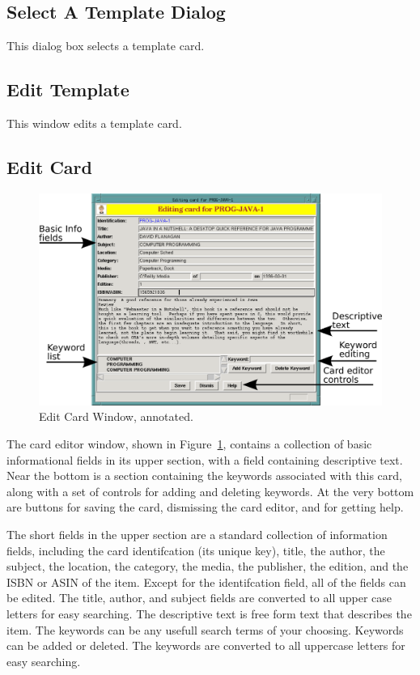\subsection{Select A Template Dialog}
This dialog box selects a template card.
\subsection{Edit Template}
This window edits a template card.
\subsection{Edit Card}
\label{sect:ref:editcard}
\begin{figure}[hpt]
\begin{centering}
\includegraphics[width=5in]{EditCardAnnotated.png}
\caption{Edit Card Window, annotated.}
\label{fig:ref:editcardAnno}
\end{centering}
\end{figure}
The card editor window, shown in Figure~\ref{fig:ref:editcardAnno},
contains a collection of basic informational fields in its upper
section, with a field containing descriptive text.  Near the bottom is
a section containing the keywords associated with this card, along with
a set of controls for adding and deleting keywords.  At the very bottom
are buttons for saving the card, dismissing the card editor, and for
getting help.

The short fields in the upper section are a standard collection of
information fields, including the card identifcation (its unique key),
title, the author, the subject, the location, the category, the media,
the publisher, the edition, and the ISBN or ASIN of the item.  Except
for the identifcation field, all of the fields can be edited.  The
title, author, and subject fields are converted to all upper case
letters for easy searching. The descriptive text is free form text that
describes the item. The keywords can be any usefull search terms of
your choosing. Keywords can be added or deleted.  The keywords are
converted to all uppercase letters for easy searching.

